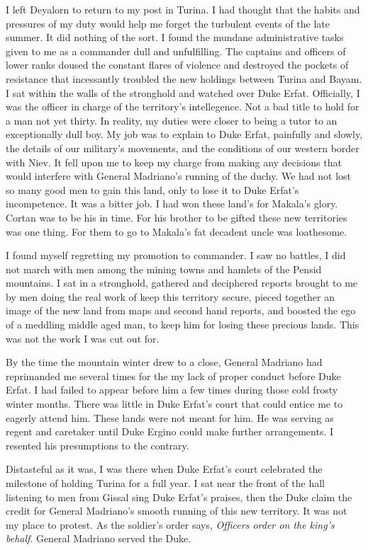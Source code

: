\documentclass{article}
\begin{document}
I left Deyalorn to return to my post in Turina. I had thought that the habits and pressures of my duty would help me forget the turbulent events of the late summer. It did nothing of the sort. I found the mundane administrative tasks given to me as a commander dull and unfulfilling. The captains and officers of lower ranks doused the constant flares of violence and destroyed the pockets of resistance that incessantly troubled the new holdings between Turina and Bayam. I sat within the walls of the stronghold and watched over Duke Erfat. Officially, I was the officer in charge of the territory's intellegence. Not a bad title to hold for a man not yet thirty. In reality, my duties were closer to being a tutor to an exceptionally dull boy. My job was to explain to Duke Erfat, painfully and slowly, the details of our military's movements, and the conditions of our western border with Niev. It fell upon me to keep my charge from making any decisions that would interfere with General Madriano's running of the duchy. We had not lost so many good men to gain this land, only to lose it to Duke Erfat's incompetence. It was a bitter job. I had won these land's for Makala's glory. Cortan was to be his in time. For his brother to be gifted these new territories was one thing. For them to go to Makala's fat decadent uncle was loathesome.
 
I found myself regretting my promotion to commander. I saw no battles, I did not march with men among the mining towns and hamlets of the Pensid mountains. I sat in a stronghold, gathered and deciphered reports brought to me by men doing the real work of keep this territory secure, pieced together an image of the new land from maps and second hand reports, and boosted the ego of a meddling middle aged man, to keep him for losing these precious lands. This was not the work I was cut out for. 

By the time the mountain winter drew to a close, General Madriano had reprimanded me several times for the my lack of proper conduct before Duke Erfat. I had failed to appear before him a few times during those cold frosty winter months. There was little in Duke Erfat's court that could entice me to eagerly attend him. These lands were not meant for him. He was serving as regent and caretaker until Duke Ergino could make further arrangements. I resented his presumptions to the contrary. 

Distasteful as it was, I was there when Duke Erfat's court celebrated the milestone of holding Turina for a full year. I sat near the front of the hall listening to men from Gissal sing Duke Erfat's praises, then the Duke claim the credit for General Madriano's smooth running of this new territory.  It was not my place to protest. As the soldier's order says, \emph{Officers order on the king's behalf}. General Madriano served the Duke.
\end{document}
